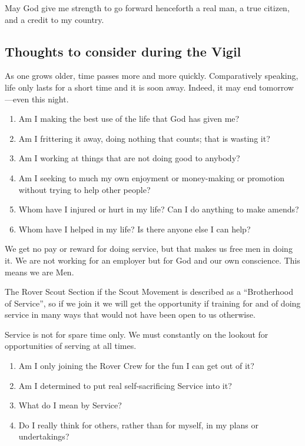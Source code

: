 \documentclass[11pt]{article}
\begin{document}
May God give me strength to go forward henceforth a real man, a true citizen, and a credit to my country.

\subsection{Thoughts to consider during the Vigil}
As one grows older, time passes more and more quickly. Comparatively speaking, life only lasts for a short time and it is soon away. Indeed, it may end tomorrow---even this night.

\begin{enumerate}
  \item Am I making the best use of the life that God has given me?
  \item Am I frittering it away, doing nothing that counts; that is wasting it?
  \item Am I working at things that are not doing good to anybody?
  \item Am I seeking to much my own enjoyment or money-making or promotion without trying to help other people?
  \item Whom have I injured or hurt in my life? Can I do anything to make amends?
  \item Whom have I helped in my life? Is there anyone else I can help?
\end{enumerate}

We get no pay or reward for doing service, but that makes us free men in doing it. We are not working for an employer but for God and our own conscience. This means we are Men.

The Rover Scout Section if the Scout Movement is described as a ``Brotherhood of Service'', so if we join it we will get the opportunity if training for and of doing service in many ways that would not have been open to us otherwise.

Service is not for spare time only. We must constantly on the lookout for opportunities of serving at all times.

\begin{enumerate}
  \item Am I only joining the Rover Crew for the fun I can get out of it?
  \item Am I determined to put real self-sacrificing Service into it?
  \item What do I mean by Service?
  \item Do I really think for others, rather than for myself, in my plans or undertakings?
\end{enumerate}
 
\end{document}
